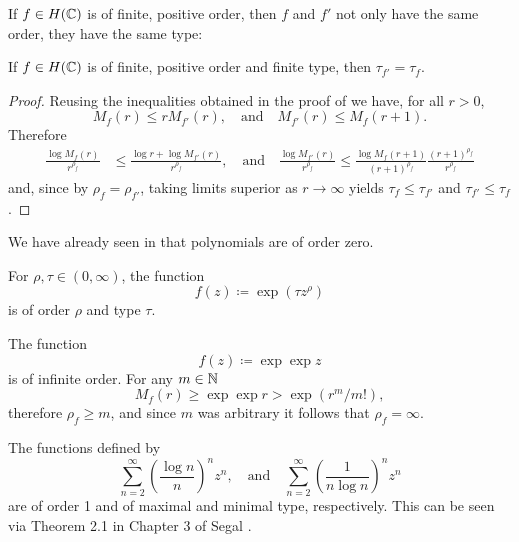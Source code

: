 
If $f \in H(\mathbb{C})$ is of finite, positive order, then $f$ and $f'$ not only have the same order, they have the same type:

\begin{proposition} \label{prop:type-derivative}
    If $f \in H(\mathbb{C})$ is of finite, positive order and finite type, then $\tau_{f'} = \tau_f$.
\end{proposition}

\begin{proof}
    Reusing the inequalities obtained in the proof of  we have, for all $r > 0$,
    \begin{equation*}
        M_f(r) \leq r M_{f'}(r), \quad \textrm{and} \quad M_{f'}(r) \leq M_f(r+1).
    \end{equation*}
    Therefore
    \begin{align*}
        \frac{\log M_f(r)}{r^{\rho_f}} &\leq \frac{\log r + \log M_{f'}(r)}{r^{\rho_f}}, \quad \textrm{and} \quad \frac{\log M_{f'}(r)}{r^{\rho_f}} \leq \frac{\log M_{f}(r+1)}{(r+1)^{\rho_f}} \frac{(r+1)^{\rho_f}}{r^{\rho_f}}
    \end{align*}
    and, since by  $\rho_f = \rho_{f'}$, taking limits superior as $r \to \infty$ yields $\tau_f \leq \tau_{f'}$ and $\tau_{f'} \leq \tau_f$.
\end{proof}

\begin{example} \label{exm:order-and-type}
    \leavevmode
    \begin{arrowlist}
        \item We have already seen in  that polynomials are of order zero.
        \item For $\rho, \tau \in (0, \infty)$, the function
        $$ f(z) \coloneqq \exp ({\tau z^\rho}) $$
        is of order $\rho$ and type $\tau$.
        \item The function
        $$ f(z) \coloneqq \exp \exp z $$
        is of infinite order. For any $m \in \mathbb{N}$
        $$ M_f(r) \geq \exp \exp r > \exp (r^m / m!), $$
        therefore $\rho_f \geq m$, and since $m$ was arbitrary it follows that $\rho_f = \infty$.
        \item The functions defined by
        $$ \sum_{n=2}^\infty \left( \frac{\log n}{n} \right)^n z^n, \quad \textrm{and} \quad \sum_{n=2}^\infty \left( \frac{1}{n \log n} \right)^n z^n $$
        are of order 1 and of maximal and minimal type, respectively. This can be seen via Theorem 2.1 in Chapter 3 of Segal \cite{segal-complex-analysis}.
        \qedhere
    \end{arrowlist}
\end{example}